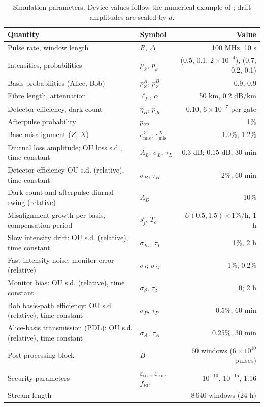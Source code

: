 \begin{table}[t]
\centering
\caption{Simulation parameters. Device values follow the numerical example of \cite{lim2014}; drift amplitudes are scaled by $d$.}\label{tab:params}
\small
\begin{tabular}{p{6.6cm}lr}
\hline
Quantity & Symbol & Value \\
\hline
Pulse rate, window length & $R$, $\Delta$ & 100 MHz, 10 s \\
Intensities, probabilities & $\mu_k$, $p_k$ & (0.5, 0.1, $2\times10^{-4}$), (0.7, 0.2, 0.1) \\
Basis probabilities (Alice, Bob) & $p_Z^A$, $p_Z^B$ & 0.9, 0.9 \\
Fibre length, attenuation & $\ell_f$, $\alpha$ & 50 km, 0.2 dB/km \\
Detector efficiency, dark count & $\eta_B$, $p_{dc}$ & 0.10, $6\times10^{-7}$ per gate \\
Afterpulse probability & $p_{\rm ap}$ & 1\% \\
Base misalignment ($Z$, $X$) & $e^Z_{\mathrm{mis}}$, $e^X_{\mathrm{mis}}$ & 1.0\%, 1.2\% \\
Diurnal loss amplitude; OU loss s.d., time constant & $A_L$; $\sigma_L$, $\tau_L$ & 0.3 dB; 0.15 dB, 30 min \\
Detector-efficiency OU s.d. (relative), time constant & $\sigma_B$, $\tau_B$ & 2\%, 60 min \\
Dark-count and afterpulse diurnal swing (relative) & $A_D$ & 10\% \\
Misalignment growth per basis, compensation period & $s_j^b$, $T_c$ & $U(0.5,1.5)\times$1\%/h, 1 h \\
Slow intensity drift: OU s.d. (relative), time constant & $\sigma_{IU}$, $\tau_I$ & 1\%, 2 h \\
Fast intensity noise; monitor error (relative) & $\sigma_I$; $\sigma_M$ & 1\%; 0.2\% \\
Monitor bias: OU s.d. (relative), time constant & $\sigma_\beta$, $\tau_\beta$ & 0; 2 h \\
Bob basis-path efficiency: OU s.d. (relative), time constant & $\sigma_P$, $\tau_P$ & 0.5\%, 60 min \\
Alice-basis transmission (PDL): OU s.d. (relative), time constant & $\sigma_A$, $\tau_A$ & 0.25\%, 30 min \\
Post-processing block & $B$ & 60 windows ($6\times10^{10}$ pulses) \\
Security parameters & $\varepsilon_{\mathrm{sec}}$, $\varepsilon_{\mathrm{cor}}$, $f_{\mathrm{EC}}$ & $10^{-10}$, $10^{-15}$, 1.16 \\
Stream length & & 8\,640 windows (24 h) \\
\hline
\end{tabular}
\end{table}

